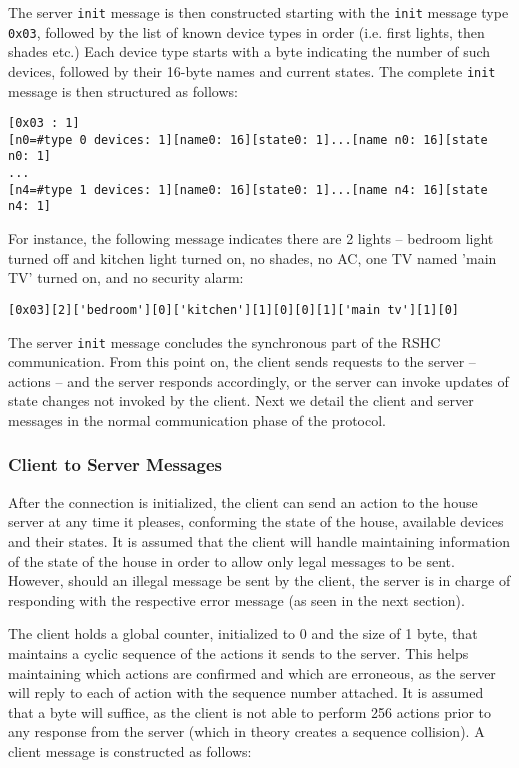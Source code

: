 \noindent
The server {\tt init} message is then constructed starting with the {\tt init} message type {\tt 0x03}, followed by the list of known device types in order (i.e. first lights, then shades etc.) Each device type starts with a byte indicating the number of such devices, followed by their 16-byte names and current states. The complete {\tt init} message is then structured as follows:

\begin{verbatim}
[0x03 : 1]
[n0=#type 0 devices: 1][name0: 16][state0: 1]...[name n0: 16][state n0: 1]
...
[n4=#type 1 devices: 1][name0: 16][state0: 1]...[name n4: 16][state n4: 1]
\end{verbatim}

\noindent
For instance, the following message indicates there are 2 lights -- bedroom light turned off and kitchen light turned on, no shades, no AC, one TV named 'main TV' turned on, and no security alarm:

\begin{verbatim}
[0x03][2]['bedroom'][0]['kitchen'][1][0][0][1]['main tv'][1][0]
\end{verbatim}

\noindent
The server {\tt init} message concludes the synchronous part of the RSHC communication. From this point on, the client sends requests to the server -- actions -- and the server responds accordingly, or the server can invoke updates of state changes not invoked by the client. Next we detail the client and server messages in the normal communication phase of the protocol.


\subsubsection{Client to Server Messages}
\label{sec:pdus:pdu:c_to_s}

After the connection is initialized, the client can send an action to the house server at any time it pleases, conforming the state of the house, available devices and their states. It is assumed that the client will handle maintaining information of the state of the house in order to allow only legal messages to be sent. However, should an illegal message be sent by the client, the server is in charge of responding with the respective error message (as seen in the next section).

The client holds a global counter, initialized to 0 and the size of 1 byte, that maintains a cyclic sequence of the actions it sends to the server. This helps maintaining which actions are confirmed and which are erroneous, as the server will reply to each of action with the sequence number attached. It is assumed that a byte will suffice, as the client is not able to perform 256 actions prior to any response from the server (which in theory creates a sequence collision). A client message is constructed as follows:

